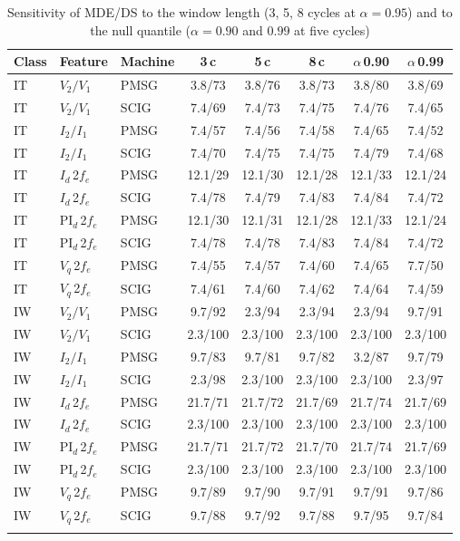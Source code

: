 \begin{table}[t]
\tabsize
\setlength{\tabcolsep}{3pt}
\caption{Sensitivity of MDE/DS to the window length (3, 5, 8 cycles at $\alpha=0.95$) and to the null quantile ($\alpha=0.90$ and $0.99$ at five cycles)}\label{tab:sens}
\begin{tabular}{@{}lllccccc@{}}
\toprule
Class & Feature & Machine & 3\,c & 5\,c & 8\,c & $\alpha$\,0.90 & $\alpha$\,0.99 \\
\midrule
IT & $V_2/V_1$ & PMSG & 3.8/73 & 3.8/76 & 3.8/73 & 3.8/80 & 3.8/69 \\
IT & $V_2/V_1$ & SCIG & 7.4/69 & 7.4/73 & 7.4/75 & 7.4/76 & 7.4/65 \\
IT & $I_2/I_1$ & PMSG & 7.4/57 & 7.4/56 & 7.4/58 & 7.4/65 & 7.4/52 \\
IT & $I_2/I_1$ & SCIG & 7.4/70 & 7.4/75 & 7.4/75 & 7.4/79 & 7.4/68 \\
IT & $I_d$\,2$f_e$ & PMSG & 12.1/29 & 12.1/30 & 12.1/28 & 12.1/33 & 12.1/24 \\
IT & $I_d$\,2$f_e$ & SCIG & 7.4/78 & 7.4/79 & 7.4/83 & 7.4/84 & 7.4/72 \\
IT & PI$_d$\,2$f_e$ & PMSG & 12.1/30 & 12.1/31 & 12.1/28 & 12.1/33 & 12.1/24 \\
IT & PI$_d$\,2$f_e$ & SCIG & 7.4/78 & 7.4/78 & 7.4/83 & 7.4/84 & 7.4/72 \\
IT & $V_q$\,2$f_e$ & PMSG & 7.4/55 & 7.4/57 & 7.4/60 & 7.4/65 & 7.7/50 \\
IT & $V_q$\,2$f_e$ & SCIG & 7.4/61 & 7.4/60 & 7.4/62 & 7.4/64 & 7.4/59 \\
IW & $V_2/V_1$ & PMSG & 9.7/92 & 2.3/94 & 2.3/94 & 2.3/94 & 9.7/91 \\
IW & $V_2/V_1$ & SCIG & 2.3/100 & 2.3/100 & 2.3/100 & 2.3/100 & 2.3/100 \\
IW & $I_2/I_1$ & PMSG & 9.7/83 & 9.7/81 & 9.7/82 & 3.2/87 & 9.7/79 \\
IW & $I_2/I_1$ & SCIG & 2.3/98 & 2.3/100 & 2.3/100 & 2.3/100 & 2.3/97 \\
IW & $I_d$\,2$f_e$ & PMSG & 21.7/71 & 21.7/72 & 21.7/69 & 21.7/74 & 21.7/69 \\
IW & $I_d$\,2$f_e$ & SCIG & 2.3/100 & 2.3/100 & 2.3/100 & 2.3/100 & 2.3/100 \\
IW & PI$_d$\,2$f_e$ & PMSG & 21.7/71 & 21.7/72 & 21.7/70 & 21.7/74 & 21.7/69 \\
IW & PI$_d$\,2$f_e$ & SCIG & 2.3/100 & 2.3/100 & 2.3/100 & 2.3/100 & 2.3/100 \\
IW & $V_q$\,2$f_e$ & PMSG & 9.7/89 & 9.7/90 & 9.7/91 & 9.7/91 & 9.7/86 \\
IW & $V_q$\,2$f_e$ & SCIG & 9.7/88 & 9.7/92 & 9.7/88 & 9.7/95 & 9.7/84 \\
\botrule
\end{tabular}
\end{table}

